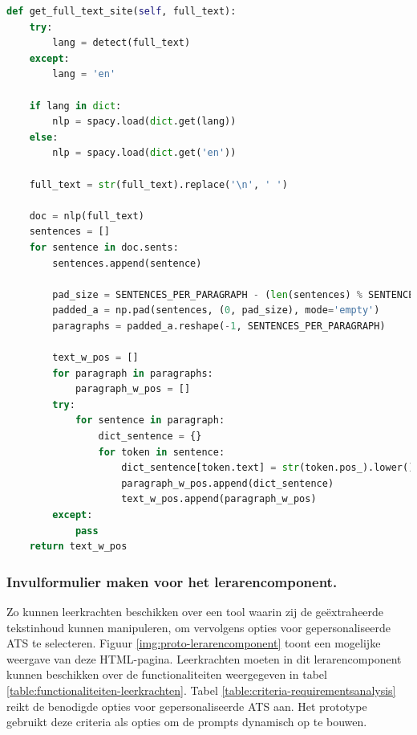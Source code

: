 \begin{lstlisting}[language=Python, caption={Het formatteren van de tekst naar een formaat voor de website.}, label={code:reader-formatting}]
def get_full_text_site(self, full_text):
	try:
		lang = detect(full_text)
	except:
		lang = 'en'
	
	if lang in dict:
		nlp = spacy.load(dict.get(lang))
	else:
		nlp = spacy.load(dict.get('en'))
	
	full_text = str(full_text).replace('\n', ' ')
	
	doc = nlp(full_text)
	sentences = []
	for sentence in doc.sents:
		sentences.append(sentence)
	
		pad_size = SENTENCES_PER_PARAGRAPH - (len(sentences) % SENTENCES_PER_PARAGRAPH)
		padded_a = np.pad(sentences, (0, pad_size), mode='empty')
		paragraphs = padded_a.reshape(-1, SENTENCES_PER_PARAGRAPH)
	
		text_w_pos = []
		for paragraph in paragraphs:
			paragraph_w_pos = []
		try:
			for sentence in paragraph:
				dict_sentence = {}
				for token in sentence:
					dict_sentence[token.text] = str(token.pos_).lower()
					paragraph_w_pos.append(dict_sentence)    
					text_w_pos.append(paragraph_w_pos)
		except:
			pass
	return text_w_pos
\end{lstlisting}

\subsubsection{Invulformulier maken voor het lerarencomponent.}

Zo kunnen leerkrachten beschikken over een tool waarin zij de geëxtraheerde tekstinhoud kunnen manipuleren, om vervolgens opties voor gepersonaliseerde ATS te selecteren. Figuur \ref{img:proto-lerarencomponent} toont een mogelijke weergave van deze HTML-pagina. Leerkrachten moeten in dit lerarencomponent kunnen beschikken over de functionaliteiten weergegeven in tabel \ref{table:functionaliteiten-leerkrachten}. Tabel \ref{table:criteria-requirementsanalysis} reikt de benodigde opties voor gepersonaliseerde ATS aan. Het prototype gebruikt deze criteria als opties om de prompts dynamisch op te bouwen.

